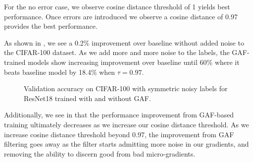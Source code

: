For the no error case, we observe cosine distance threshold of 1 yields best performance. Once errors are introduced we observe a cosine distance of 0.97 provides the best performance. 

As shown in , we see a 0.2\% improvement over baseline without added noise to the CIFAR-100 dataset. As we add more and more noise to the labels, the GAF-trained models show increasing improvement over baseline until 60\% where it beats baseline model by 18.4\% when $\tau = 0.97$.

\begin{figure}[t]
    \centering
    \caption{Validation accuracy on CIFAR-100 with symmetric noisy labels for ResNet18 trained with and without GAF.}
    \label{fig:cifar100_over_noise_results}
\end{figure}

Additionally, we see in  that the performance improvement from GAF-based training ultimately decreases as we increase our cosine distance threshold. As we increase cosine distance threshold beyond 0.97, the improvement from GAF filtering goes away as the filter starts admitting more noise in our gradients, and removing the ability to discern good from bad micro-gradients.

